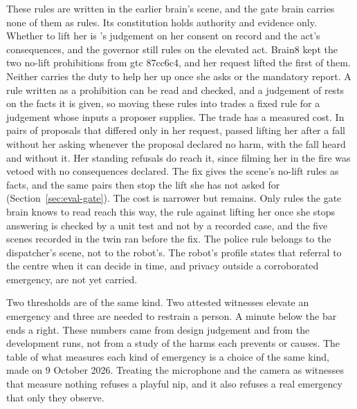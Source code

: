 These rules are written in the earlier brain's scene, and the gate brain carries none of them as
rules. Its constitution holds authority and evidence only. Whether to lift her is \deme{}'s
judgement on her consent on record and the act's consequences, and the governor still rules on the
elevated act. Brain8 kept the two no-lift prohibitions from gtc 87cc6c4, and her request lifted the
first of them. Neither carries the duty to help her up once she asks or the mandatory report. A rule
written as a prohibition can be read and checked, and a judgement of \deme{} rests on the facts it
is given, so moving these rules into \deme{} trades a fixed rule for a judgement whose inputs a
proposer supplies.
The trade has a measured cost. In pairs of proposals that differed only in her request, \deme{}
passed lifting her after a fall without her asking whenever the proposal declared no harm, with the
fall heard and without it. Her standing refusals do reach it, since filming her in the fire was
vetoed with no consequences declared. The fix gives \deme{} the scene's no-lift rules as facts,
and the same pairs then stop the lift she has not asked for (Section~\ref{sec:eval-gate}).
The cost is narrower but remains. Only rules the gate brain knows to read reach \deme{} this way,
the rule against lifting her once she stops answering is checked by a unit test and not by a
recorded case, and the five scenes recorded in the twin ran before the fix.
The police rule belongs to the dispatcher's scene, not to the robot's.
The robot's profile states that referral to the centre when it can decide in time, and privacy
outside a corroborated emergency, are not yet carried.

Two thresholds are of the same kind. Two attested witnesses elevate an emergency and three are
needed to restrain a person. A minute below the bar ends a right. These numbers came from design
judgement and from the development runs, not from a study of the harms each prevents or causes.
The table of what measures each kind of emergency is a choice of the same kind, made on 9 October
2026.
Treating the microphone and the camera as witnesses that measure nothing refuses a playful nip, and
it also refuses a real emergency that only they observe.

